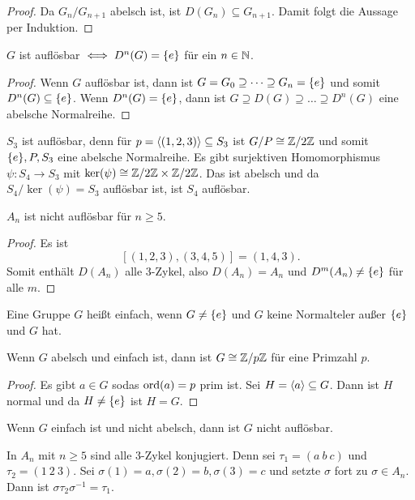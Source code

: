 \begin{proof}
    Da \(G_n/G_{n+1}\) abelsch ist, ist \(D(G_n)\subseteq G_{n+1}\). Damit folgt die Aussage per Induktion.
\end{proof}
\begin{Satz}
    \(G\) ist auflösbar \(\iff D^n(G)=\{e\}\) für ein \(n\in\mathbb{N}\).
\end{Satz}
\begin{proof}
    Wenn \(G\) auflösbar ist, dann ist \(G=G_0\supseteq\dots\supseteq G_n=\{e\}\) und somit \(D^n(G)\subseteq \{e\}\).
    Wenn \(D^n(G)=\{e\}\), dann ist \(G\supseteq D(G)\supseteq\dots\supseteq D^n(G)\) eine abelsche Normalreihe.
\end{proof}
\begin{Bsp}
    \(S_3\) ist auflösbar, denn für \(p=\langle(1,2,3)\rangle\subseteq S_3\) ist \(G/P\cong \mathbb{Z}/2\mathbb{Z}\) und somit \(\{e\}, P,S_3\) eine abelsche Normalreihe.
    Es gibt surjektiven Homomorphismus \(\psi\colon S_4\to S_3\) mit \(\ker(\psi)\cong \mathbb{Z}/2\mathbb{Z}\times\mathbb{Z}/2\mathbb{Z}\). Das ist abelsch und da \(S_4/\ker(\psi)=S_3\) auflösbar ist, ist \(S_4\) auflösbar.
\end{Bsp}
\begin{Satz}
    \(A_n\) ist nicht auflösbar für \(n\geq 5\).
\end{Satz}
\begin{proof}
    Es ist \[[(1,2,3),(3,4,5)]=(1,4,3).\] Somit enthält \(D(A_n)\) alle 3-Zykel, also \(D(A_n)=A_n\) und \(D^m(A_n)\neq\{e\}\) für alle \(m\).
\end{proof}
\begin{Def}
    Eine Gruppe \(G\) heißt einfach, wenn \(G\neq \{e\}\) und \(G\) keine Normalteler außer \(\{e\}\) und \(G\) hat.
\end{Def}
\begin{Bem}
    Wenn \(G\) abelsch und einfach ist, dann ist \(G\cong \mathbb{Z}/p\mathbb{Z}\) für eine Primzahl \(p.\)
\end{Bem}
\begin{proof}
    Es gibt \(a\in G\) sodas \(\operatorname{ord}(a)=p\) prim ist. Sei \(H=\langle a\rangle\subseteq G\). Dann ist \(H\) normal und da \(H\neq \{e\}\) ist \(H=G\).
\end{proof}
\begin{Bem} Wenn \(G\) einfach ist und nicht abelsch, dann ist \(G\) nicht auflösbar.
\end{Bem}
\begin{Bem}
    In \(A_n\) mit \(n\geq 5\) sind alle 3-Zykel konjugiert. Denn sei \(\tau_1=(a \ b\ c)\) und \(\tau_2=(1\ 2\ 3)\). Sei \(\sigma(1)=a, \sigma(2)=b, \sigma(3)=c\) und setzte \(\sigma\) fort zu \(\sigma\in A_n\). Dann ist \(\sigma\tau_2\sigma^{-1}=\tau_1\).
\end{Bem}
